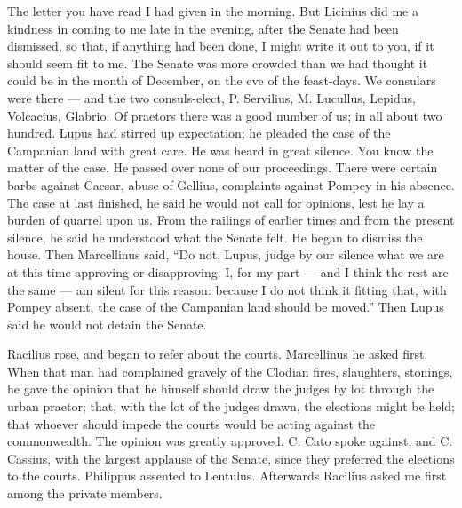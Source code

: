 

 The letter you have read I had given in the morning. But Licinius did me a kindness in coming to me late in the evening, after the Senate had been dismissed, so that, if anything had been done, I might write it out to you, if it should seem fit to me. The Senate was more crowded than we had thought it could be in the month of December, on the eve of the feast-days. We consulars were there --- and the two consuls-elect, P. Servilius, M. Lucullus, Lepidus, Volcacius, Glabrio. Of praetors there was a good number of us; in all about two hundred. Lupus had stirred up expectation; he pleaded the case of the Campanian land with great care. He was heard in great silence. You know the matter of the case. He passed over none of our proceedings. There were certain barbs against Caesar, abuse of Gellius, complaints against Pompey in his absence. The case at last finished, he said he would not call for opinions, lest he lay a burden of quarrel upon us. From the railings of earlier times and from the present silence, he said he understood what the Senate felt. He began to dismiss the house. Then Marcellinus said, ``Do not, Lupus, judge by our silence what we are at this time approving or disapproving. I, for my part --- and I think the rest are the same --- am silent for this reason: because I do not think it fitting that, with Pompey absent, the case of the Campanian land should be moved.'' Then Lupus said he would not detain the Senate.

 Racilius rose, and began to refer about the courts. Marcellinus he asked first. When that man had complained gravely of the Clodian fires, slaughters, stonings, he gave the opinion that he himself should draw the judges by lot through the urban praetor; that, with the lot of the judges drawn, the elections might be held; that whoever should impede the courts would be acting against the commonwealth. The opinion was greatly approved. C. Cato spoke against, and C. Cassius, with the largest applause of the Senate, since they preferred the elections to the courts. Philippus assented to Lentulus. Afterwards Racilius asked me first among the private members.

